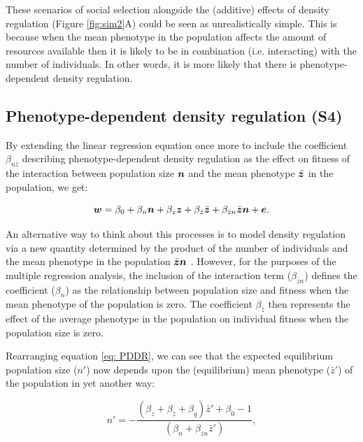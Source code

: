 \documentclass{article}
\begin{document}
These scenarios of social selection alongside the (additive) effects of density regulation (Figure \ref{fig:sim2}A) could be seen as unrealistically simple. This is because when the mean phenotype in the population affects the amount of resources available then it is likely to be in combination (i.e. interacting) with the number of individuals. In other words, it is more likely that there is phenotype-dependent density regulation. 

\subsection{Phenotype-dependent density regulation (S4)}

By extending the linear regression equation once more to include the coefficient $\beta_{n \bar{z}}$ describing phenotype-dependent density regulation as the effect on fitness of the interaction between population size $\vectorsym{n}$ and the mean phenotype $\bar{\vectorsym{z}}$ in the population, we get: 

\begin{equation} \label{eq: PDDR}
\vectorsym{w}=\beta_{0} +\beta_{n} \vectorsym{n} + \beta_{z} \vectorsym{z}+ \beta_{\bar{z}} \bar{\vectorsym{z}} + \beta_{\bar{z}n} \bar{\vectorsym{z}} \vectorsym{n}  +  \vectorsym{e}.
\end{equation}

An alternative way to think about this processes is to model density regulation via a new quantity determined by the product of the number of individuals and the mean phenotype in the population $\bar{\vectorsym{z}}\vectorsym{n}$ \citep{Engen2020}. However, for the purposes of the multiple regression analysis, the inclusion of the interaction term ($\beta_{\bar{z}n}$) defines the coefficient ($\beta_{n}$) as the relationship between population size and fitness when the mean phenotype of the population is zero. The coefficient $ \beta_{\bar{z}}$ then represents the effect of the average phenotype in the population on individual fitness when the population size is zero. 

Rearranging equation \ref{eq: PDDR}, we can see that the expected equilibrium population size ($n'$) now depends upon the (equilibrium) mean phenotype ($\bar{z}'$) of the population in yet another way:

\begin{equation}
n' = -\frac{(\beta_{z}  + \beta_{\bar{z}} + \beta_{q})\bar{z}'+\beta_{0} -1}{(\beta_{n} +  \beta_{\bar{z}n} \bar{z}')},
\end{equation}
\end{document}
